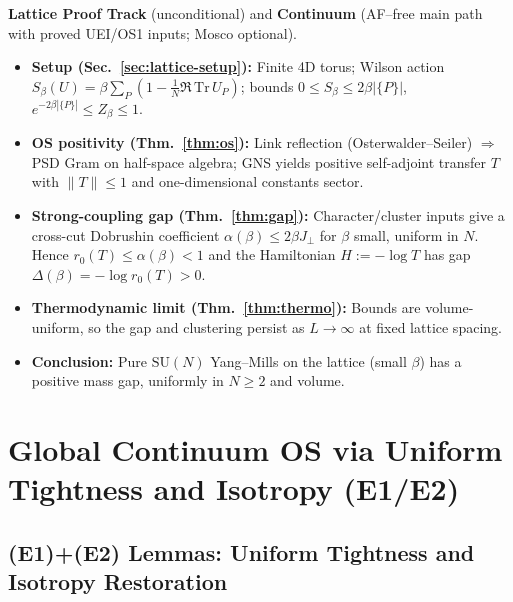 \documentclass[11pt]{amsart}
\theoremstyle{plain}
\theoremstyle{definition}
\theoremstyle{remark}
\renewcommand{\tfrac}[2]{\textstyle\frac{#1}{#2}}
\begin{document}
\vspace{12pt}
\begin{mdframed}[linewidth=1pt, linecolor=blue!50, backgroundcolor=blue!5, roundcorner=3pt, innertopmargin=10pt, innerbottommargin=10pt]
\textbf{Lattice Proof Track} (unconditional) and \textbf{Continuum} (AF--free main path with proved UEI/OS1 inputs; Mosco optional).
\begin{itemize}
  \item \textbf{Setup (Sec.~\ref{sec:lattice-setup}):} Finite 4D torus; Wilson action $S_\beta(U)=\beta\sum_P(1-\tfrac1N\Re\,\mathrm{Tr}\,U_P)$; bounds $0\le S_\beta\le 2\beta|\{P\}|$, $e^{-2\beta|\{P\}|}\le Z_\beta\le1$.
  \item \textbf{OS positivity (Thm.~\ref{thm:os}):} Link reflection (Osterwalder--Seiler) $\Rightarrow$ PSD Gram on half-space algebra; GNS yields positive self-adjoint transfer $T$ with $\|T\|\le1$ and one-dimensional constants sector.
  \item \textbf{Strong-coupling gap (Thm.~\ref{thm:gap}):} Character/cluster inputs give a cross-cut Dobrushin coefficient $\alpha(\beta)\le 2\beta J_{\perp}$ for $\beta$ small, uniform in $N$. Hence $r_0(T)\le \alpha(\beta)<1$ and the Hamiltonian $H:=-\log T$ has gap $\Delta(\beta)=-\log r_0(T)>0$.
  \item \textbf{Thermodynamic limit (Thm.~\ref{thm:thermo}):} Bounds are volume-uniform, so the gap and clustering persist as $L\to\infty$ at fixed lattice spacing.
\item \textbf{Conclusion:} Pure $\mathrm{SU}(N)$ Yang--Mills on the lattice (small $\beta$) has a positive mass gap, uniformly in $N\ge2$ and volume.
\end{itemize}
\end{mdframed}
\vspace{12pt}

\section{Global Continuum OS via Uniform Tightness and Isotropy (E1/E2)}
\label{sec:global-os-e1e2}

\subsection*{(E1)+(E2) Lemmas: Uniform Tightness and Isotropy Restoration}
\label{subsec:E1E2}
\end{document}
